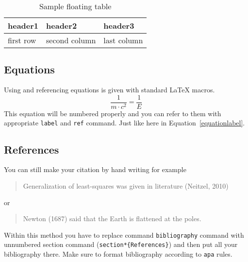 \documentclass{rgg}
\begin{document}
    \begin{table}[b]
      \caption{Sample floating table}
      \label{labelforgloatingtable}
      \begin{tabular}{@{}lll@{}}
        \toprule
        header1 & header2 & header3 \\
        \midrule
        first row  & second column & last column \\
        \bottomrule
      \end{tabular}
    \end{table}

  \subsection{Equations}
    Using and referencing equations 
    is given with standard \LaTeX{} macros.
    \begin{equation}
      \frac{1}{m\cdot c^2} = \frac{1}{E}
      \label{equationlabel}
    \end{equation}
    This equation will be numbered properly and you
    can refer to them with appropriate
    \texttt{label} and \texttt{ref} command.
    Just like here in Equation~\ref{equationlabel}.

  \subsection{References}
    You can still make your citation by hand writing for example
    \begin{quotation}
      Generalization of least-squares was given in literature (Neitzel, 2010)
    \end{quotation}
    or 
    \begin{quotation}
      Newton (1687) said that the Earth is flattened at the poles. 
    \end{quotation}
    Within this method you have to replace command \texttt{bibliography}
    command with unnumbered section command (\texttt{section*\{References\}})
    and then put all your bibliography there. Make sure to format bibliography
    according to \texttt{apa} rules.
\end{document}
